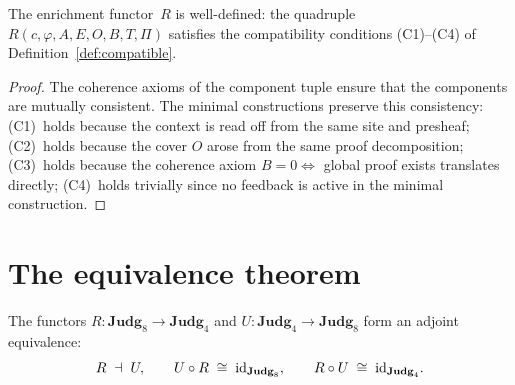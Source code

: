 \begin{proposition}
\label{prop:R-well-defined}
The enrichment functor~$R$ is well-defined: the quadruple
$R(c, \varphi, A, E, O, B, T, \Pi)$ satisfies the compatibility
conditions (C1)--(C4) of Definition~\ref{def:compatible}.
\end{proposition}

\begin{proof}
The coherence axioms of the component tuple ensure that the components
are mutually
consistent.  The minimal constructions preserve this consistency:
(C1)~holds because the context is read off from the same site and
presheaf; (C2)~holds because the cover $O$ arose from the same proof
decomposition; (C3)~holds because the coherence axiom
$B = 0 \Leftrightarrow$ global proof exists translates directly;
(C4)~holds trivially since no feedback is active in the minimal
construction.
\end{proof}

\section{The equivalence theorem}
\label{sec:equivalence-theorem}

\begin{theorem}
\label{thm:equivalence}
The functors $R : \mathbf{Judg}_8 \to \mathbf{Judg}_4$ and
$U : \mathbf{Judg}_4 \to \mathbf{Judg}_8$ form an adjoint equivalence:
\[
  R \;\dashv\; U,
  \qquad
  U \circ R \;\cong\; \mathrm{id}_{\mathbf{Judg}_8},
  \qquad
  R \circ U \;\cong\; \mathrm{id}_{\mathbf{Judg}_4}.
\]
\end{theorem}

